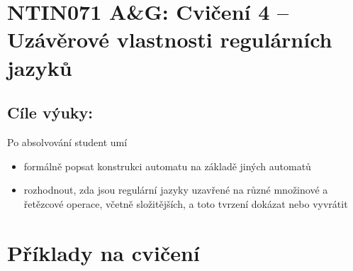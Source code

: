 \documentclass[a4paper,12pt]{amsart}
\begin{document}
\thispagestyle{empty}

\section*{NTIN071 A\&G: Cvičení 4 -- Uzávěrové vlastnosti regulárních jazyků}

\medskip

\subsection*{Cíle výuky:} Po absolvování student umí

\begin{itemize}\setlength{\itemsep}{0pt}  
    \item formálně popsat konstrukci automatu na základě jiných automatů  
    \item rozhodnout, zda jsou regulární jazyky uzavřené na různé množinové a řetězcové operace, včetně složitějších, a toto tvrzení dokázat nebo vyvrátit  
 \end{itemize}  
 

\section*{Příklady na cvičení}
\end{document}
